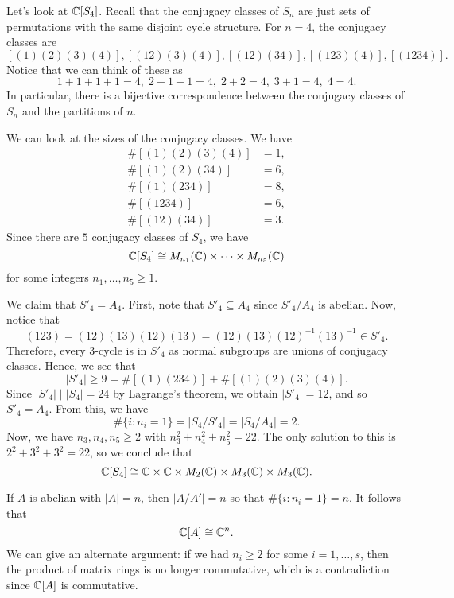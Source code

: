 \begin{exmp}
    Let's look at $\mathbb{C}[S_4]$. Recall that the conjugacy classes of $S_n$ 
    are just sets of permutations with the same disjoint cycle structure. 
    For $n = 4$, the conjugacy classes are 
    \[ [(1)(2)(3)(4)], [(12)(3)(4)], [(12)(34)], [(123)(4)], [(1234)]. \] 
    Notice that we can think of these as
    \[ 1+1+1+1=4,\; 2+1+1=4,\; 2+2=4,\; 3+1=4,\; 4=4. \] 
    In particular, there is a bijective correspondence between the conjugacy 
    classes of $S_n$ and the partitions of $n$. 

    We can look at the sizes of the conjugacy classes. We have 
    \begin{align*} 
        \#[(1)(2)(3)(4)] &= 1, \\ 
        \#[(1)(2)(34)] &= 6, \\
        \#[(1)(234)] &= 8, \\
        \#[(1234)] &= 6, \\
        \#[(12)(34)] &= 3. 
    \end{align*}
    Since there are $5$ conjugacy classes of $S_4$, we have 
    \[ \mathbb{C}[S_4] \cong M_{n_1}(\mathbb{C}) \times \cdots \times M_{n_5}(\mathbb{C}) \] 
    for some integers $n_1, \dots, n_5 \geq 1$. 

    We claim that $S'_4 = A_4$. First, note that $S'_4 \subseteq A_4$ 
    since $S'_4/A_4$ is abelian. Now, notice that 
    \[ (123) = (12)(13)(12)(13) = (12)(13)(12)^{-1}(13)^{-1} \in S'_4. \] 
    Therefore, every $3$-cycle is in $S'_4$ as normal subgroups 
    are unions of conjugacy classes. Hence, we see that 
    \[ |S'_4| \geq 9 = \#[(1)(234)] + \#[(1)(2)(3)(4)]. \] 
    Since $|S'_4| \mid |S_4| = 24$ by Lagrange's theorem, we obtain 
    $|S'_4| = 12$, and so $S'_4 = A_4$. From this, we have  
    \[ \#\{i : n_i = 1\} = |S_4/S'_4| = |S_4/A_4| = 2. \] 
    Now, we have $n_3, n_4, n_5 \geq 2$ with $n_3^2 + n_4^2 + n_5^2 = 22$. 
    The only solution to this is $2^2 + 3^2 + 3^2 = 22$, so we conclude that 
    \[ \mathbb{C}[S_4] \cong \mathbb{C} \times \mathbb{C} \times M_2(\mathbb{C}) \times M_3(\mathbb{C}) \times M_3(\mathbb{C}). \] 
\end{exmp}

\begin{exmp}
    If $A$ is abelian with $|A| = n$, then $|A/A'| = n$ so that 
    $\#\{i : n_i = 1\} = n$. It follows that 
    \[ \mathbb{C}[A] \cong \mathbb{C}^n. \] 
    We can give an alternate argument: if we had $n_i \geq 2$ for some 
    $i = 1, \dots, s$, then the product of matrix rings is no longer 
    commutative, which is a contradiction since $\mathbb{C}[A]$ is commutative. 
\end{exmp}

